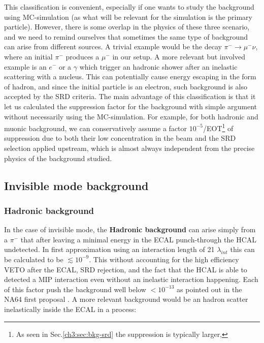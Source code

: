 This classification is convenient, especially if one wants to study the background using MC-simulation (as what will be relevant for the simulation is the primary particle). However, there is some overlap in the physics of these three scenario, and we need to remind ourselves that sometimes the same type of background can arise from different sources. A trivial example would be the decay $\pi^- \rightarrow \mu^-\nu$, where an initial $\pi^-$ produces a $\mu^-$ in our setup. A more relevant but involved example is an $e^-$ or a $\gamma$ which trigger an hadronic shower after an inelastic scattering with a nucleus. This can potentially cause energy escaping in the form of hadron, and since the initial particle is an electron, such background is also accepted by the SRD criteria. The main advantage of this classification is that it let us calculated the suppression factor for the background with simple argument without necessarily using the MC-simulation. For example, for both hadronic and muonic background, we can conservatively assume a factor $10^{-5}$/EOT\footnote{As seen in Sec.\ref{ch3:sec:bkg-srd} the suppression is typically larger,} of suppression due to both their low concentration in the beam and the SRD selection applied upstream, which is almost always independent from the precise physics of the background studied.

\subsection{Invisible mode background}
\label{ch3:sec:bkg:inv}

\subsubsection{Hadronic background}
\label{ch3:sec:bkg:inv:hadr}

In the case of invisible mode, the \textbf{Hadronic background} can arise simply from a $\pi^-$ that after leaving a minimal energy in the ECAL punch-through the HCAL undetected. In first approximation using an interaction length of 21 $\lambda_{int}$ this can be calculated to be $\lesssim 10^{-9}$. This without accounting for the high efficiency VETO after the ECAL, SRD rejection, and the fact that the HCAL is able to detected a MIP interaction even without an inelastic interaction happening. Each of this factor push the background well below $<10^{-13}$ as pointed out in the NA64 first proposal \cite{Andreas:2013lya}. A more relevant background would be an hadron scatter inelastically inside the ECAL in a process:

